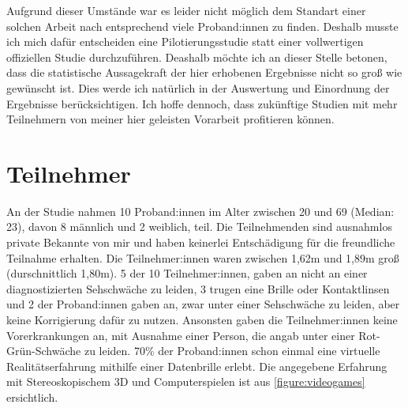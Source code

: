         Aufgrund dieser Umstände war es leider nicht möglich dem Standart einer solchen Arbeit nach entsprechend viele Proband:innen zu finden. Deshalb musste ich mich dafür entscheiden eine Pilotierungsstudie statt einer vollwertigen offiziellen Studie durchzuführen. Deashalb möchte ich an dieser Stelle betonen, dass die statistische Aussagekraft der hier erhobenen Ergebnisse nicht so groß wie gewünscht ist. Dies werde ich natürlich in der Auswertung und Einordnung der Ergebnisse berücksichtigen. Ich hoffe dennoch, dass zukünftige Studien mit mehr Teilnehmern von meiner hier geleisten Vorarbeit profitieren können.

    \section{Teilnehmer}\label{sec:participants}
        An der Studie nahmen 10 Proband:innen im Alter zwischen 20 und 69 (Median: 23), davon 8 männlich und 2 weiblich, teil. Die Teilnehmenden sind ausnahmlos private Bekannte von mir und haben keinerlei Entschädigung für die freundliche Teilnahme erhalten.
        Die Teilnehmer:innen waren zwischen 1,62m und 1,89m groß (durschnittlich 1,80m).
        5 der 10 Teilnehmer:innen, gaben an nicht an einer diagnostizierten Sehschwäche zu leiden, 3 trugen eine Brille oder Kontaktlinsen und 2 der Proband:innen gaben an, zwar unter einer Sehschwäche zu leiden, aber keine Korrigierung dafür zu nutzen. Ansonsten gaben die Teilnehmer:innen keine Vorerkrankungen an, mit Ausnahme einer Person, die angab unter einer Rot-Grün-Schwäche zu leiden.
        70\% der Proband:innen schon einmal eine virtuelle Realitätserfahrung mithilfe einer Datenbrille erlebt. Die angegebene Erfahrung mit Stereoskopischem 3D und Computerspielen ist aus \autoref{figure:videogames} ersichtlich.

